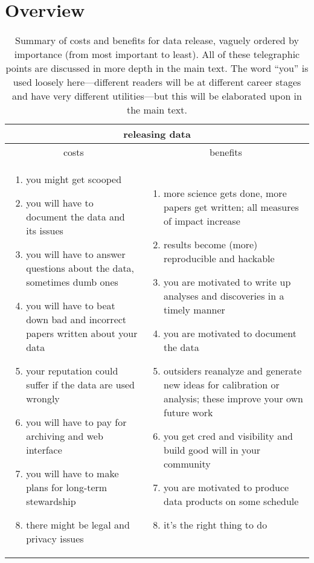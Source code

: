 \documentclass[12pt,twoside,pdftex]{article}
\begin{document}
\section{Overview}

\newlength{\cwidth}\setlength{\cwidth}{0.483\textwidth}%
\begin{table}%
\begin{tabular}{@{}p{\cwidth}|p{\cwidth}@{}}%
\multicolumn{2}{c}{\textbf{releasing data}} \\ \hline
\multicolumn{1}{c|}{costs} & \multicolumn{1}{c}{benefits} \\ \hline
\begin{enumerate}\raggedright
\item you might get scooped
\item you will have to document the data and its issues
\item you will have to answer questions about the data, sometimes dumb ones
\item you will have to beat down bad and incorrect papers written about your data
\item your reputation could suffer if the data are used wrongly
\item you will have to pay for archiving and web interface
\item you will have to make plans for long-term stewardship
\item there might be legal and privacy issues
\end{enumerate}&\begin{enumerate}\raggedright
\item more science gets done, more papers get written; all measures of impact increase
\item results become (more) reproducible and hackable
\item you are motivated to write up analyses and discoveries in a timely manner
\item you are motivated to document the data
\item outsiders reanalyze and generate new ideas for calibration or analysis; these improve your own future work
\item you get cred and visibility and build good will in your community
\item you are motivated to produce data products on some schedule
\item it's the right thing to do
\end{enumerate}\end{tabular}
\caption{Summary of costs and benefits for data release, vaguely
  ordered by importance (from most important to least). All of these
  telegraphic points are discussed in more depth in the main text. The
  word ``you'' is used loosely here---different readers will be at
  different career stages and have very different utilities---but this
  will be elaborated upon in the main text.\label{tab:data}}
\end{table}
\end{document}
